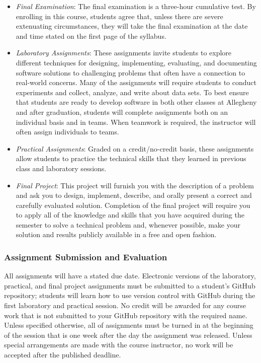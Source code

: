 \documentclass[11pt]{article}
\begin{document}
\begin{itemize}
  \item {\em Final Examination\/}: The final examination is a three-hour cumulative test. By enrolling in this course,
    students agree that, unless there are severe extenuating circumstances, they will take the final examination at the
    date and time stated on the first page of the syllabus.

  \item {\em Laboratory Assignments\/}: These assignments invite students to explore different techniques for designing,
    implementing, evaluating, and documenting software solutions to challenging problems that often have a connection to
    real-world concerns. Many of the assignments will require students to conduct experiments and collect, analyze, and
    write about data sets. To best ensure that students are ready to develop software in both other classes at Allegheny
    and after graduation, students will complete assignments both on an individual basis and in teams. When teamwork is
    required, the instructor will often assign individuals to teams.

  \item {\em Practical Assignments\/}: Graded on a credit/no-credit basis, these assignments allow students to practice
    the technical skills that they learned in previous class and laboratory sessions.

  \item {\em Final Project\/}: This project will furnish you with the description of a problem and ask you to design,
    implement, describe, and orally present a correct and carefully evaluated solution. Completion of the final project
    will require you to apply all of the knowledge and skills that you have acquired during the semester to solve a
    technical problem and, whenever possible, make your solution and results publicly available in a free and open
    fashion.

\end{itemize}

\subsubsection*{Assignment Submission and Evaluation}

All assignments will have a stated due date. Electronic versions of the laboratory, practical, and final project
assignments must be submitted to a student's GitHub repository; students will learn how to use version control with
GitHub during the first laboratory and practical session. No credit will be awarded for any course work that is not
submitted to your GitHub repository with the required name. Unless specified otherwise, all of assignments must be
turned in at the beginning of the session that is one week after the day the assignment was released. Unless special
arrangements are made with the course instructor, no work will be accepted after the published deadline.
\end{document}
